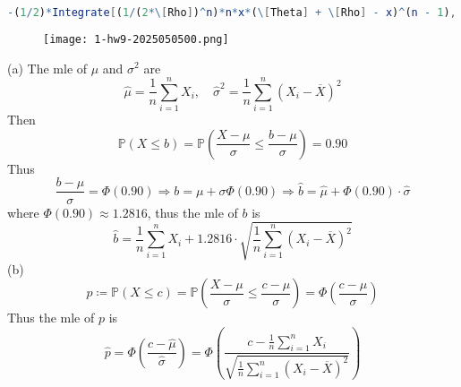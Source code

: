 \begin{lstlisting}[language=mathematica]
-(1/2)*Integrate[(1/(2*\[Rho])^n)*n*x*(\[Theta] + \[Rho] - x)^(n - 1), {x, \[Theta] - \[Rho], \[Theta] + \[Rho]}] + (1/2)*Integrate[(1/(2*\[Rho])^n)*n*x*(x - \[Theta] + \[Rho])^(n - 1), {x, \[Theta] - \[Rho], \[Theta] + \[Rho]}]
\end{lstlisting}
\begin{exercise}
\begin{figure}[H]
\centering
\texttt{[image: 1-hw9-2025050500.png]}
\label{}
\end{figure}
\end{exercise}
(a)
The mle of $\mu$ and $\sigma^{2}$ are
\[
\widehat{\mu}=\frac{1}{n}\sum_{i=1}^{n} X_i,\quad \widehat{\sigma}^2=\frac{1}{n}\sum_{i=1}^{n} (X_i-\overline{X})^2
\]
Then
\[
\mathbb{P}(X\leq b)=\mathbb{P}\left( \frac{X-\mu}{\sigma}\leq \frac{b-\mu}{\sigma} \right)=0.90
\]
Thus
\[
\frac{b-\mu}{\sigma}=\Phi(0.90)\Rightarrow b=\mu+\sigma \Phi(0.90)\Rightarrow \widehat{b}=\widehat{\mu}+\Phi(0.90)\cdot\widehat{\sigma}
\]
where $\Phi(0.90)\approx1.2816$, thus the mle of $b$ is
\[
\widehat{b}=\frac{1}{n}\sum_{i=1}^{n} X_i+1.2816\cdot \sqrt{ \frac{1}{n}\sum_{i=1}^{n} (X_i-\overline{X})^2 }
\]
(b)
\[
p\coloneqq \mathbb{P}(X\leq c)=\mathbb{P}\left( \frac{X-\mu}{\sigma}\leq \frac{c-\mu}{\sigma} \right)=\Phi\left( \frac{c-\mu}{\sigma} \right)
\]
Thus the mle of $p$ is
\[
\widehat{p}=\Phi\left( \frac{c-\widehat{\mu}}{\widehat{\sigma}} \right)=\Phi\left( \frac{c-\frac{1}{n}\sum_{i=1}^{n} X_i}{\sqrt{ \frac{1}{n}\sum_{i=1}^{n} (X_i-\overline{X})^2 }} \right)
\]